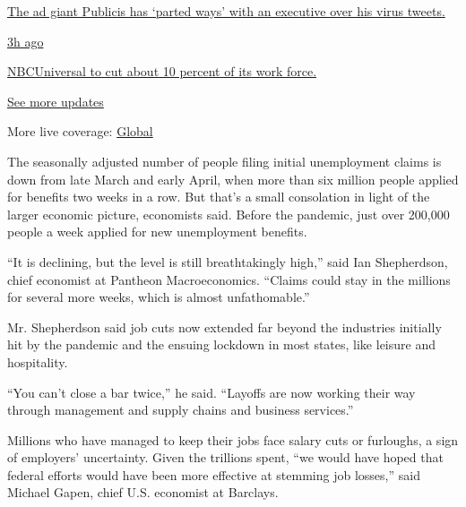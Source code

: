 \href{https://www.nytimes.com/live/2020/08/04/business/stock-market-today-coronavirus?action=click\&pgtype=Article\&state=default\&region=MAIN_CONTENT_1\&context=storylines_live_updates\#the-ad-giant-publicis-has-parted-ways-with-an-executive-over-his-virus-tweets}{The
ad giant Publicis has `parted ways' with an executive over his virus
tweets.}

\href{https://www.nytimes.com/live/2020/08/04/business/stock-market-today-coronavirus?action=click\&pgtype=Article\&state=default\&region=MAIN_CONTENT_1\&context=storylines_live_updates\#nbcuniversal-to-cut-about-10-percent-of-its-work-force}{3h
ago}

\href{https://www.nytimes.com/live/2020/08/04/business/stock-market-today-coronavirus?action=click\&pgtype=Article\&state=default\&region=MAIN_CONTENT_1\&context=storylines_live_updates\#nbcuniversal-to-cut-about-10-percent-of-its-work-force}{NBCUniversal
to cut about 10 percent of its work force.}

\href{https://www.nytimes.com/live/2020/08/04/business/stock-market-today-coronavirus?action=click\&pgtype=Article\&state=default\&region=MAIN_CONTENT_1\&context=storylines_live_updates}{See
more updates}

More live coverage:
\href{https://www.nytimes.com/2020/08/04/world/coronavirus-cases.html?action=click\&pgtype=Article\&state=default\&region=MAIN_CONTENT_1\&context=storylines_live_updates}{Global}

The seasonally adjusted number of people filing initial unemployment
claims is down from late March and early April, when more than six
million people applied for benefits two weeks in a row. But that's a
small consolation in light of the larger economic picture, economists
said. Before the pandemic, just over 200,000 people a week applied for
new unemployment benefits.

``It is declining, but the level is still breathtakingly high,'' said
Ian Shepherdson, chief economist at Pantheon Macroeconomics. ``Claims
could stay in the millions for several more weeks, which is almost
unfathomable.''

Mr. Shepherdson said job cuts now extended far beyond the industries
initially hit by the pandemic and the ensuing lockdown in most states,
like leisure and hospitality.

``You can't close a bar twice,'' he said. ``Layoffs are now working
their way through management and supply chains and business services.''

Millions who have managed to keep their jobs face salary cuts or
furloughs, a sign of employers' uncertainty. Given the trillions spent,
``we would have hoped that federal efforts would have been more
effective at stemming job losses,'' said Michael Gapen, chief U.S.
economist at Barclays.

